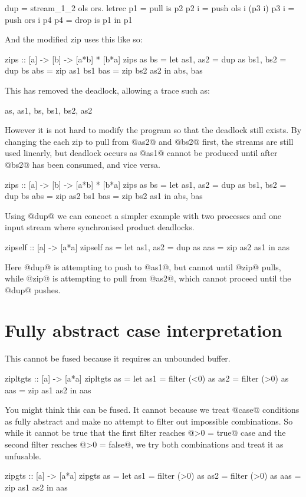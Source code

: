 \begin{code}
dup = stream_1_2 \is ols ors.
  letrec
    p1   = pull is p2
    p2 i = push ols i (p3 i)
    p3 i = push ors i p4
    p4   = drop is p1
  in p1
\end{code}
And the modified zip uses this like so:

\begin{code}
zips :: [a] -> [b] -> [a*b] * [b*a]
zips as bs =
  let as1, as2 = dup as
      bs1, bs2 = dup bs
      abs = zip as1 bs1
      bas = zip bs2 as2
  in  abs, bas
\end{code}

This has removed the deadlock, allowing a trace such as:
\begin{code}
as, as1, bs, bs1, bs2, as2
\end{code}

However it is not hard to modify the program so that the deadlock still exists.
By changing the each zip to pull from @as2@ and @bs2@ first, the streams are still used linearly, but deadlock occurs as @as1@ cannot be produced until after @bs2@ has been consumed, and vice versa.
\begin{code}
zips :: [a] -> [b] -> [a*b] * [b*a]
zips as bs =
  let as1, as2 = dup as
      bs1, bs2 = dup bs
      abs = zip as2 bs1
      bas = zip bs2 as1
  in  abs, bas
\end{code}

Using @dup@ we can concoct a simpler example with two processes and one input stream where synchronised product deadlocks.
\begin{code}
zipself :: [a] -> [a*a]
zipself as =
  let as1, as2 = dup as
      aas = zip as2 as1
  in  aas
\end{code}
Here @dup@ is attempting to push to @as1@, but cannot until @zip@ pulls, while @zip@ is attempting to pull from @as2@, which cannot proceed until the @dup@ pushes.

\section{Fully abstract case interpretation}

This cannot be fused because it requires an unbounded buffer.
\begin{code}
zipltgts :: [a] -> [a*a]
zipltgts as =
  let as1 = filter (<0) as
      as2 = filter (>0) as
      aas = zip as1 as2
  in  aas
\end{code}

You might think this can be fused.
It cannot because we treat @case@ conditions as fully abstract and make no attempt to filter out impossible combinations.
So while it cannot be true that the first filter reaches @>0 = true@ case and the second filter reaches @>0 = false@, we try both combinations and treat it as unfusable.
\begin{code}
zipgts :: [a] -> [a*a]
zipgts as =
  let as1 = filter (>0) as
      as2 = filter (>0) as
      aas = zip as1 as2
  in  aas
\end{code}


